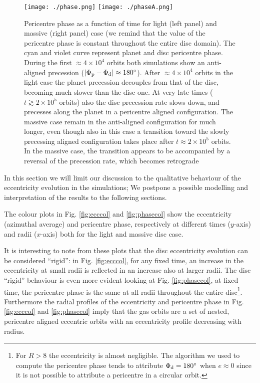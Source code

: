 \documentclass[usenatbib,a4paper,times,fleqn]{mnras}
\begin{document}
\begin{figure*}
\begin{center}
\texttt{[image: ./phase.png]}
\texttt{[image: ./phaseA.png]}
\caption{Pericentre phase as a function of time for light (left panel) and massive (right panel) case (we remind that the value of the pericentre phase is constant throughout the entire disc domain). The cyan and violet curve represent planet and disc pericentre phase. During the first $\approx 4\times 10^4$ orbits both simulations show an anti-aligned precession ($|\Phi_{\rm p}-\Phi_{\rm d}|\approx 180^\circ$). After $\approx 4\times 10^4$ orbits in the light case the planet precession decouples from that of the disc, becoming much slower than the disc one. At very late times ($t\gtrsim 2\times 10^5$ orbits) also the disc precession rate slows down, and precesses along the planet in a pericentre aligned configuration. The massive case remain in the anti-aligned configuration for much longer, even though also in this case a transition toward the slowly precessing aligned configuration takes place after $t\approx 2\times 10^5$ orbits. In the massive case, the transition appears to be accompanied by a reversal of the precession rate, which becomes retrograde} 
\label{fig:phase}
\end{center}
\end{figure*}

In this section we will limit our discussion to the qualitative behaviour of the eccentricity evolution in the simulations; We postpone a possible modelling and interpretation of the results to the following sections.

The colour plots in Fig. \ref{fig:ecccol} and \ref{fig:phasecol} show the eccentricity (azimuthal average) and pericentre phase, respectively at different times ($y$-axis) and radii ($x$-axis) both for the light and massive disc case. 

It is interesting to note from these plots that the disc eccentricity evolution can be considered ``rigid'': in Fig. \ref{fig:ecccol}, for any fixed time, an increase in the eccentricity at small radii is reflected in an increase also at larger radii. The disc ``rigid'' behaviour is even more evident looking at Fig. \ref{fig:phasecol}, at fixed time, the pericentre phase is the same at all radii throughout the entire disc\footnote{For $R>8$ the eccentricity is almost negligible. The algorithm we used to compute the pericentre phase tends to attribute $\Phi_{\rm d}=180^\circ$ when $e\approx 0$ since it is not possible to attribute a pericentre in a circular orbit.}. Furthermore the radial profiles of the eccentricity and pericentre phase in Fig. \ref{fig:ecccol} and \ref{fig:phasecol} imply that the gas orbits are a set of nested, pericentre aligned eccentric orbits with an eccentricity profile decreasing with radius.
\end{document}
